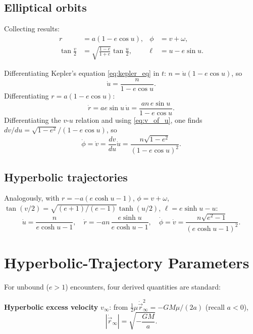\documentclass[11pt]{article}
\newcommand{\vecr}{\vec r}
\begin{document}
\subsection{Elliptical orbits}
Collecting results:
\begin{align}
r&=a(1-e\cos u), & \phi&=v+\omega,\\
\tan\frac v2 &= \sqrt{\frac{1-e}{1+e}}\tan\frac u2, & \ell&=u-e\sin u.
\end{align}

Differentiating Kepler's equation \eqref{eq:kepler_eq} in $t$: $n=\dot u(1-e\cos u)$, so
\begin{equation}
\dot u = \frac{n}{1-e\cos u}. \label{eq:udot}
\end{equation}
Differentiating $r=a(1-e\cos u)$:
\begin{equation}
\dot r = ae\sin u\,\dot u = \frac{an\,e\sin u}{1-e\cos u}. \label{eq:rdot_u}
\end{equation}
Differentiating the $v$-$u$ relation and using \eqref{eq:v_of_u}, one finds $dv/du = \sqrt{1-e^2}/(1-e\cos u)$, so
\begin{equation}
\dot\phi = \dot v = \frac{dv}{du}\dot u = \frac{n\sqrt{1-e^2}}{(1-e\cos u)^2}. \label{eq:phidot_u}
\end{equation}

\subsection{Hyperbolic trajectories}
Analogously, with $r=-a(e\cosh u - 1)$, $\phi=v+\omega$, $\tan(v/2)=\sqrt{(e+1)/(e-1)}\tanh(u/2)$, $\ell=e\sinh u - u$:
\begin{equation}
\dot u = \frac{n}{e\cosh u - 1},\quad
\dot r = -an\,\frac{e\sinh u}{e\cosh u - 1},\quad
\dot\phi=\dot v = \frac{n\sqrt{e^2-1}}{(e\cosh u-1)^2}. \label{eq:hyp_derivs}
\end{equation}

\section{Hyperbolic-Trajectory Parameters}

For unbound ($e>1$) encounters, four derived quantities are standard:

\textbf{Hyperbolic excess velocity} $v_\infty$: from $\tfrac12\mu\dot{\vecr}_\infty^2 = -GM\mu/(2a)$ (recall $a<0$),
\begin{equation}
|\dot{\vecr}_\infty| = \sqrt{-\frac{GM}{a}}. \label{eq:vinf}
\end{equation}
\end{document}
